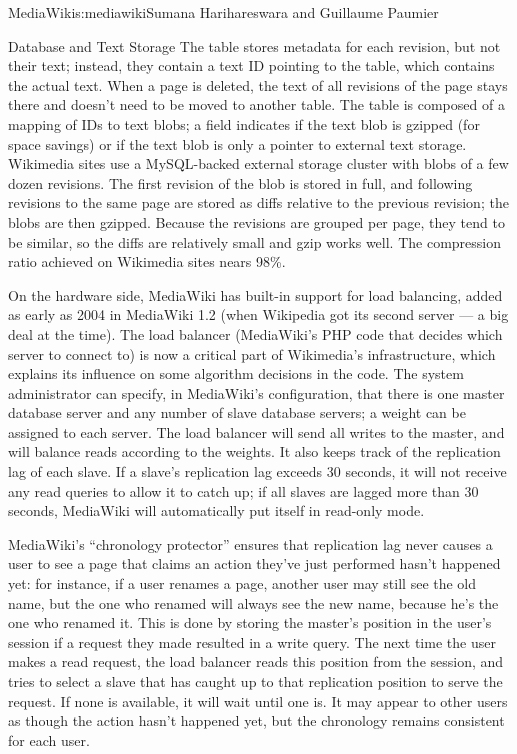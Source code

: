 \begin{aosachapter}{MediaWiki}{s:mediawiki}{Sumana Harihareswara and Guillaume Paumier}
\begin{aosasect1}{Database and Text Storage}
The  table stores metadata for each revision, but not
their text; instead, they contain a text ID pointing to the
 table, which contains the actual text. When a page is
deleted, the text of all revisions of the page stays there and doesn't
need to be moved to another table. The  table is composed
of a mapping of IDs to text blobs; a  field indicates if the text
blob is gzipped (for space savings) or if the text blob is only a
pointer to external text storage. Wikimedia sites use a MySQL-backed
external storage cluster with blobs of a few dozen revisions. The
first revision of the blob is stored in full, and following revisions
to the same page are stored as diffs relative to the previous
revision; the blobs are then gzipped. Because the revisions are
grouped per page, they tend to be similar, so the diffs are relatively
small and gzip works well. The compression ratio achieved on Wikimedia
sites nears 98\%.

On the hardware side, MediaWiki has built-in support for load
balancing, added as early as 2004 in MediaWiki 1.2 (when Wikipedia got
its second server --- a big deal at the time). The load balancer
(MediaWiki's PHP code that decides which server to connect to) is now
a critical part of Wikimedia's infrastructure, which explains its
influence on some algorithm decisions in the code. The system
administrator can specify, in MediaWiki's configuration, that there is
one master database server and any number of slave database servers;
a weight can be assigned to each server. The load balancer will send
all writes to the master, and will balance reads according to the
weights. It also keeps track of the replication lag of each slave. If
a slave's replication lag exceeds 30 seconds, it will not receive any
read queries to allow it to catch up; if all slaves are lagged more
than 30 seconds, MediaWiki will automatically put itself in read-only
mode.

MediaWiki's ``chronology protector'' ensures that replication lag never
causes a user to see a page that claims an action they've just
performed hasn't happened yet: for instance, if a user renames a page,
another user may still see the old name, but the one who renamed will
always see the new name, because he's the one who renamed it. This is
done by storing the master's position in the user's session if a
request they made resulted in a write query. The next time the user
makes a read request, the load balancer reads this position from the
session, and tries to select a slave that has caught up to that
replication position to serve the request. If none is available, it
will wait until one is. It may appear to other users as though the
action hasn't happened yet, but the chronology remains consistent for
each user.


\end{aosasect1}
\end{aosachapter}
